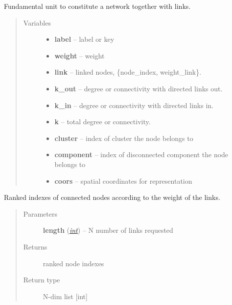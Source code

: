 \documentclass[letterpaper,10pt,english]{sphinxmanual}
\begin{document}
\begin{fulllineitems}
\label{networks:pyn_cl_net.cl_node}
Fundamental unit to constitute a network together with links.
\begin{quote}\begin{description}
\item[{Variables}] \leavevmode\begin{itemize}
\item {} 
\textbf{label} -- label or key

\item {} 
\textbf{weight} -- weight

\item {} 
\textbf{link} -- linked nodes, \{node\_index, weight\_link\}.

\item {} 
\textbf{k\_out} -- degree or connectivity with directed links out.

\item {} 
\textbf{k\_in} -- degree or connectivity with directed links in.

\item {} 
\textbf{k} -- total degree or connectivity.

\item {} 
\textbf{cluster} -- index of cluster the node belongs to

\item {} 
\textbf{component} -- index of disconnected component the node belongs to

\item {} 
\textbf{coors} -- spatial coordinates for representation

\end{itemize}

\end{description}\end{quote}

\begin{fulllineitems}
\label{networks:pyn_cl_net.cl_node.most_weighted_links}
Ranked indexes of connected nodes according to the weight of the links.
\begin{quote}\begin{description}
\item[{Parameters}] \leavevmode
\textbf{length} (\href{http://docs.python.org/library/functions.html\#int}{\emph{int}}) -- N number of links requested

\item[{Returns}] \leavevmode
ranked node indexes

\item[{Return type}] \leavevmode
N-dim list {[}int{]}

\end{description}\end{quote}

\end{fulllineitems}


\end{fulllineitems}
\end{document}
